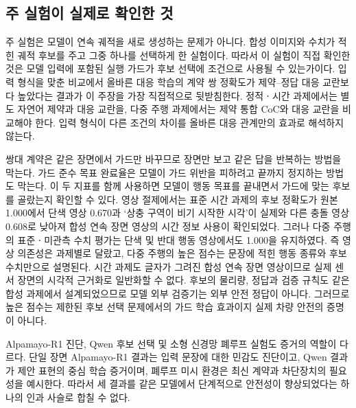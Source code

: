 
\subsection{주 실험이 실제로 확인한 것}

주 실험은 모델이 연속 궤적을 새로 생성하는 문제가 아니다. 합성 이미지와 수치가 적힌 궤적 후보를 주고 그중 하나를 선택하게 한 실험이다. 따라서 이 실험이 직접 확인한 것은 모델 입력에 포함된 실행 가드가 후보 선택에 조건으로 사용될 수 있는가이다. 입력 형식을 맞춘 비교에서 올바른 대응 학습의 계약 쌍 정확도가 제약--정답 대응 교란보다 높았다는 결과가 이 주장을 가장 직접적으로 뒷받침한다. 정적ㆍ시간 과제에서는 별도 자연어 제약과 대응 교란을, 다중 주행 과제에서는 제약 통합 CoC와 대응 교란을 비교해야 한다. 입력 형식이 다른 조건의 차이를 올바른 대응 관계만의 효과로 해석하지 않는다.

쌍대 계약은 같은 장면에서 가드만 바꾸므로 장면만 보고 같은 답을 반복하는 방법을 막는다. 가드 준수 목표 완료율은 모델이 가드 위반을 피하려고 끝까지 정지하는 방법도 막는다. 이 두 지표를 함께 사용하면 모델이 행동 목표를 끝내면서 가드에 맞는 후보를 골랐는지 확인할 수 있다. 영상 절제에서는 표준 시간 과제의 후보 정확도가 원본 1.000에서 단색 영상 0.670과 `상충 구역이 비기 시작한 시각'이 실제와 다른 충돌 영상 0.608로 낮아져 합성 연속 장면 영상의 시간 정보 사용이 확인되었다. 그러나 다중 주행의 표준ㆍ미관측 수치 평가는 단색 및 반대 행동 영상에서도 1.000을 유지하였다. 즉 영상 의존성은 과제별로 달랐고, 다중 주행의 높은 점수는 문장에 적힌 행동 종류와 후보 수치만으로 설명된다. 시간 과제도 글자가 그려진 합성 연속 장면 영상이므로 실제 센서 장면의 시각적 근거화로 일반화할 수 없다. 후보의 물리량, 정답과 검증 규칙도 같은 합성 과제에서 설계되었으므로 모델 외부 검증기는 외부 안전 정답이 아니다. 그러므로 높은 점수는 제한된 후보 선택 문제에서의 가드 학습 효과이지 실제 차량 안전의 증명이 아니다.

Alpamayo-R1 진단, Qwen 후보 선택 및 소형 신경망 폐루프 실험도 증거의 역할이 다르다. 단일 장면 Alpamayo-R1 결과는 입력 문장에 대한 민감도 진단이고, Qwen 결과가 제안 표현의 중심 학습 증거이며, 폐루프 미시 환경은 최신 계약과 차단장치의 필요성을 예시한다. 따라서 세 결과를 같은 모델에서 단계적으로 안전성이 향상되었다는 하나의 인과 사슬로 합칠 수 없다.


